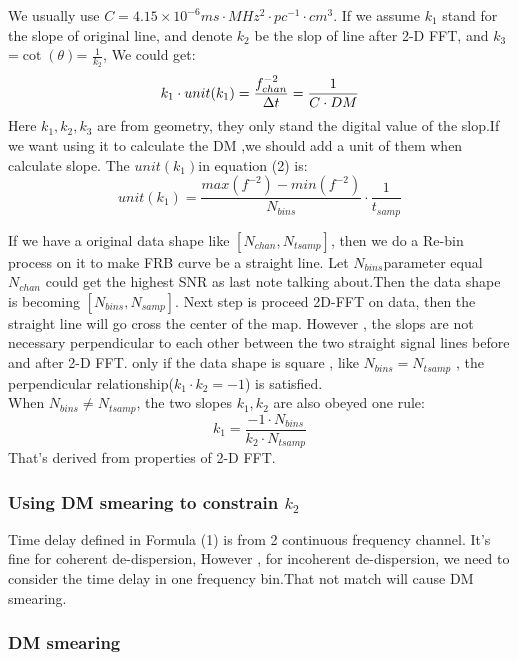 \documentclass{aastex61}
\begin{document}
We usually use $C = 4.15 \times 10^{-6} ms \cdot MHz^2 \cdot pc^{-1} \cdot cm^3$.
If we assume $k_{1}$ stand for the slope of original line, and denote $k_{2}$ be the slop of line after 2-D FFT, and $k_{3}$=$\cot( \theta)$= $\frac{1}{k_2}$, We could get:
\begin{equation}
\centering  k_1 \cdot unit(k_1) = \frac{f^{-2}_{chan}}{\Delta t} = \frac{1}{C\cdot DM} 
\end{equation}
Here $k_1,k_2,k_3$ are from geometry, they only stand the digital value of the slop.If we want using it to calculate the DM ,we should add a unit of them when calculate slope. The $unit(k_1)$in equation (2) is:
\begin{equation}
unit(k_1)= \frac{max(f^{-2})-min(f^{-2})}{N_{bins}} \cdot \frac{1}{t_{samp}} 
\end{equation}


If we have a original data shape like $[N_{chan},N_{tsamp}]$, then we do a Re-bin process on it to make FRB curve be a straight line. Let $N_{bins}$parameter equal $N_{chan}$ could get the highest SNR as last note talking about.Then the data shape is becoming $[N_{bins}, N_{samp}]$. Next step is proceed 2D-FFT on data, then the straight line will go cross the center of the map. However , the slops are not necessary perpendicular to each other between the two straight signal lines before and after 2-D FFT. only if the data shape is square , like $N_{bins}=N_{tsamp}$ , the perpendicular relationship($k_1\cdot k_2=-1$) is satisfied. \\

When $N_{bins} \neq N_{tsamp}$, the two slopes $k_1,k_2$ are also obeyed one rule:
\begin{equation}
 k_1 =\frac{-1\cdot N_{bins}}{k_2 \cdot N_{tsamp}}
\end{equation}That's derived from properties of 2-D FFT.
\subsubsection{Using DM smearing to constrain $k_2$}

Time delay defined in Formula (1) is from 2 continuous frequency channel. It's fine for coherent de-dispersion, However , for incoherent de-dispersion, we need to consider the time delay in one frequency bin.That not match will cause DM smearing. 

\subsubsection{DM smearing}
\end{document}
